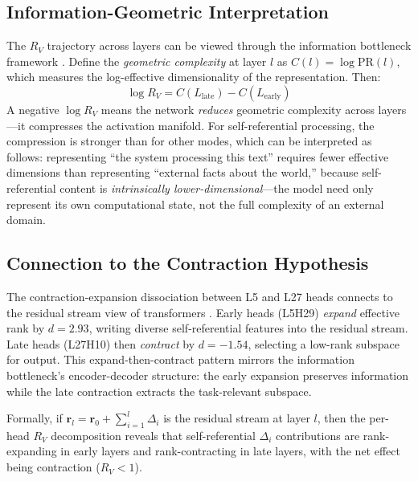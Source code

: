 \documentclass{article}
\newcommand{\RV}{R_V}
\newcommand{\PR}{\text{PR}}
\newcommand{\dcohen}{d}
\begin{document}
\subsection{Information-Geometric Interpretation}

The $\RV$ trajectory across layers can be viewed through the information bottleneck framework \citep{tishby2000information}.
Define the \emph{geometric complexity} at layer $l$ as $C(l) = \log \PR(l)$, which measures the log-effective dimensionality of the representation.
Then:
\begin{equation}
    \log \RV = C(L_{\text{late}}) - C(L_{\text{early}})
\end{equation}
A negative $\log \RV$ means the network \emph{reduces} geometric complexity across layers---it compresses the activation manifold.
For self-referential processing, the compression is stronger than for other modes, which can be interpreted as follows: representing ``the system processing this text'' requires fewer effective dimensions than representing ``external facts about the world,'' because self-referential content is \emph{intrinsically lower-dimensional}---the model need only represent its own computational state, not the full complexity of an external domain.

\subsection{Connection to the Contraction Hypothesis}

The contraction-expansion dissociation between L5 and L27 heads connects to the residual stream view of transformers \citep{elhage2021mathematical}.
Early heads (L5H29) \emph{expand} effective rank by $\dcohen{=}2.93$, writing diverse self-referential features into the residual stream.
Late heads (L27H10) then \emph{contract} by $\dcohen{=}{-}1.54$, selecting a low-rank subspace for output.
This expand-then-contract pattern mirrors the information bottleneck's encoder-decoder structure: the early expansion preserves information while the late contraction extracts the task-relevant subspace.

Formally, if $\mathbf{r}_l = \mathbf{r}_0 + \sum_{i=1}^{l} \Delta_i$ is the residual stream at layer $l$, then the per-head $\RV$ decomposition reveals that self-referential $\Delta_i$ contributions are rank-expanding in early layers and rank-contracting in late layers, with the net effect being contraction ($\RV < 1$).
\end{document}
